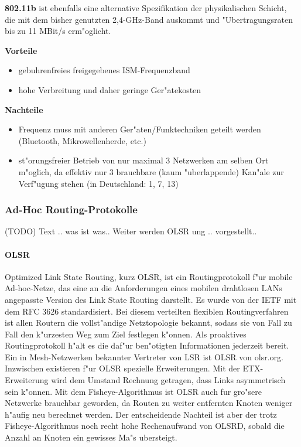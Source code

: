 \textbf{802.11b} ist ebenfalls eine alternative Spezifikation der physikalischen
Schicht, die mit dem bisher genutzten 2,4-GHz-Band auskommt und
"Ubertragungsraten bis zu 11 MBit/s erm"oglicht. 

\textbf{Vorteile}
\begin{itemize}	
	\item gebuhrenfreies freigegebenes ISM-Frequenzband 
	\item hohe Verbreitung und daher geringe Ger"atekosten 
\end{itemize}

\textbf{Nachteile}
\begin{itemize}	
	\item Frequenz muss mit anderen Ger"aten/Funktechniken geteilt werden
	(Bluetooth, Mikrowellenherde, etc.) 
	\item st"orungsfreier Betrieb von nur maximal 3 Netzwerken
	am selben Ort m"oglich, da effektiv nur 3 brauchbare
	(kaum "uberlappende) Kan"ale zur Verf"ugung stehen
	(in Deutschland: 1, 7, 13) 
\end{itemize}

\subsubsection{Ad-Hoc Routing-Protokolle}
(TODO) Text .. was ist was.. 
Weiter werden OLSR ung .. vorgestellt..

\paragraph{OLSR}

Optimized Link State Routing, kurz OLSR, ist ein Routingprotokoll
f"ur mobile Ad-hoc-Netze, das eine an die Anforderungen eines mobilen
drahtlosen LANs angepasste Version des Link State Routing darstellt. Es
wurde von der IETF mit dem RFC 3626 standardisiert. Bei diesem
verteilten flexiblen Routingverfahren ist allen Routern die vollst"andige
Netztopologie bekannt, sodass sie von Fall zu Fall den k"urzesten Weg zum
Ziel festlegen k"onnen. Als proaktives Routingprotokoll h"alt es die daf"ur
ben"otigten Informationen jederzeit bereit. Ein in Mesh-Netzwerken
bekannter Vertreter von LSR ist OLSR von olsr.org. Inzwischen existieren
f"ur OLSR spezielle Erweiterungen. Mit der ETX-Erweiterung wird dem
Umstand Rechnung getragen, dass Links asymmetrisch sein k"onnen. Mit
dem Fisheye-Algorithmus ist OLSR auch fur gro"sere Netzwerke brauchbar
geworden, da Routen zu weiter entfernten Knoten weniger h"aufig neu
berechnet werden. Der entscheidende Nachteil ist aber der trotz
Fisheye-Algorithmus noch recht hohe Rechenaufwand von OLSRD, sobald
die Anzahl an Knoten ein gewisses Ma"s ubersteigt.

